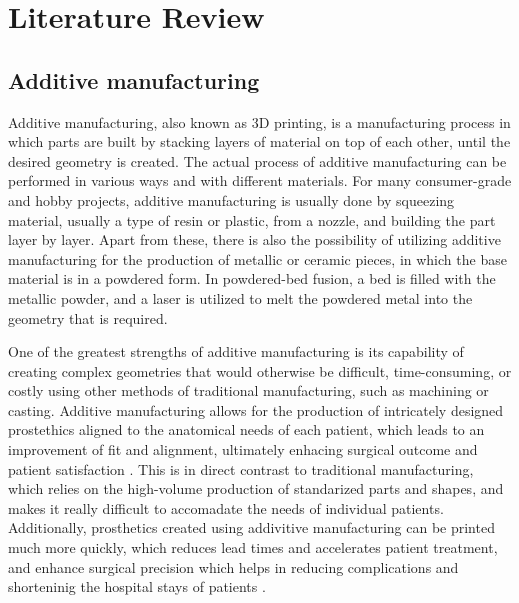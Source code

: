 \documentclass[../main.tex]{subfiles}
\begin{document}
	
\chapter{Literature Review}

\section{Additive manufacturing}

Additive manufacturing, also known as 3D printing, is a manufacturing process in which parts are built by stacking layers of material on top of each other, until the desired geometry is created. The actual process of additive manufacturing can be performed in various ways and with different materials. For many consumer-grade and hobby projects, additive manufacturing is usually done by squeezing material, usually a type of resin or plastic, from a nozzle, and building the part layer by layer. Apart from these, there is also the possibility of utilizing additive manufacturing for the production of metallic or ceramic pieces, in which the base material is in a powdered form. In powdered-bed fusion, a bed is filled with the metallic powder, and a laser is utilized to melt the powdered metal into the geometry that is required.

One of the greatest strengths of additive manufacturing is its capability of creating complex geometries that would otherwise be difficult, time-consuming, or costly using other methods of traditional manufacturing, such as machining or casting. Additive manufacturing allows for the production of intricately designed prostethics aligned to the anatomical needs of each patient, which leads to an improvement of fit and alignment, ultimately enhacing surgical outcome and patient satisfaction \cite{mobarakRecentAdvancesAdditive2023}. This is in direct contrast to traditional manufacturing, which relies on the high-volume production of standarized parts and shapes, and makes it really difficult to accomadate the needs of individual patients. Additionally, prosthetics created using addivitive manufacturing can be printed much more quickly, which reduces lead times and accelerates patient treatment, and enhance surgical precision which helps in reducing complications and shorteninig the hospital stays of patients \cite{pathak3DPrintingBiomedicine2023}.
\end{document}

